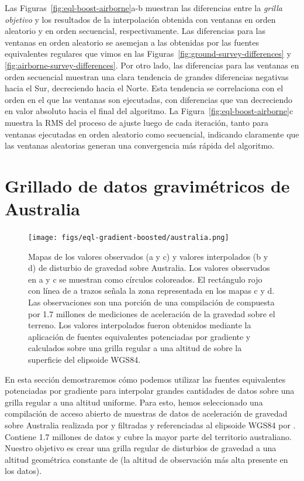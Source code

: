 Las Figuras~\ref{fig:eql-boost-airborne}a-b
muestran las diferencias entre la \emph{grilla objetivo} y los resultados de la
interpolación obtenida con ventanas en orden aleatorio y en orden secuencial,
respectivamente.
Las diferencias para las ventanas en orden aleatorio se asemejan a las
obtenidas por las fuentes equivalentes regulares que vimos en las
Figuras~\ref{fig:ground-survey-differences}
y \ref{fig:airborne-survey-differences}.
Por otro lado, las diferencias para las ventanas en orden secuencial muestran
una clara tendencia de grandes diferencias negativas hacia el Sur, decreciendo
hacia el Norte.
Esta tendencia se correlaciona con el orden en el que las ventanas son
ejecutadas, con diferencias que van decreciendo en valor absoluto hacia el
final del algoritmo.
La Figura~\ref{fig:eql-boost-airborne}c
muestra la \ac{RMS} del proceso de ajuste luego de cada iteración, tanto para
ventanas ejecutadas en orden aleatorio como secuencial, indicando claramente
que las ventanas aleatorias generan una convergencia más rápida del algoritmo.



\section{Grillado de datos gravimétricos de Australia}

\begin{figure}[p]
    \texttt{[image: figs/eql-gradient-boosted/australia.png]}
    \caption{
        Mapas de los valores observados (a y c) y valores interpolados (b y d)
        de disturbio de gravedad sobre Australia.
        Los valores observados en a y c se muestran como círculos coloreados.
        El rectángulo rojo con línea de a trazos señala la zona representada en
        los mapas c y d.
        Las observaciones son una porción de una compilación de
        \citet{wynne2018} compuesta por 1.7 millones de mediciones de
        aceleración de la gravedad sobre el terreno.
        Los valores interpolados fueron obtenidos mediante la aplicación de
        fuentes equivalentes potenciadas por gradiente y calculados sobre una
        grilla regular a una altitud de \AustraliaEqlGridHeight{} sobre la
        superficie del elipsoide WGS84.
    }
    \label{fig:australia}
\end{figure}

En esta sección demostraremos cómo podemos utilizar las fuentes equivalentes
potenciadas por gradiente para interpolar grandes cantidades de datos sobre
una grilla regular a una altitud uniforme.
Para esto, hemos seleccionado una compilación de acceso abierto de muestras de
datos de aceleración de gravedad sobre Australia realizada por
\citet{wynne2018} y filtradas y referenciadas al elipsoide WGS84 por
\citet{australia_compilation}.
Contiene 1.7 millones de datos y cubre la mayor parte del territorio
australiano.
Nuestro objetivo es crear una grilla regular de disturbios de gravedad a una
altitud geométrica constante de \AustraliaEqlGridHeight{} (la altitud de
observación más alta presente en los datos).

